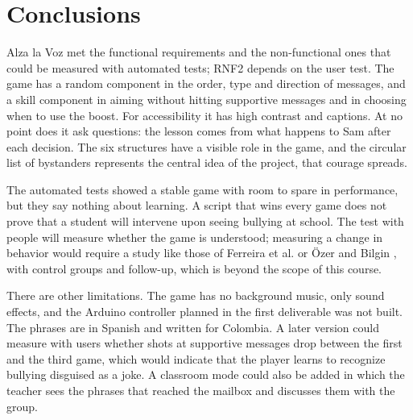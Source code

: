 \documentclass[conference]{IEEEtran}
\begin{document}
\section{Conclusions}

Alza la Voz met the functional requirements and the non-functional ones that could be measured with automated tests; RNF2 depends on the user test. The game has a random component in the order, type and direction of messages, and a skill component in aiming without hitting supportive messages and in choosing when to use the boost. For accessibility it has high contrast and captions. At no point does it ask questions: the lesson comes from what happens to Sam after each decision. The six structures have a visible role in the game, and the circular list of bystanders represents the central idea of the project, that courage spreads.

The automated tests showed a stable game with room to spare in performance, but they say nothing about learning. A script that wins every game does not prove that a student will intervene upon seeing bullying at school. The test with people will measure whether the game is understood; measuring a change in behavior would require a study like those of Ferreira et al. \cite{ref3} or Özer and Bilgin \cite{ref9}, with control groups and follow-up, which is beyond the scope of this course.

There are other limitations. The game has no background music, only sound effects, and the Arduino controller planned in the first deliverable was not built. The phrases are in Spanish and written for Colombia. A later version could measure with users whether shots at supportive messages drop between the first and the third game, which would indicate that the player learns to recognize bullying disguised as a joke. A classroom mode could also be added in which the teacher sees the phrases that reached the mailbox and discusses them with the group.

\FloatBarrier
\end{document}
